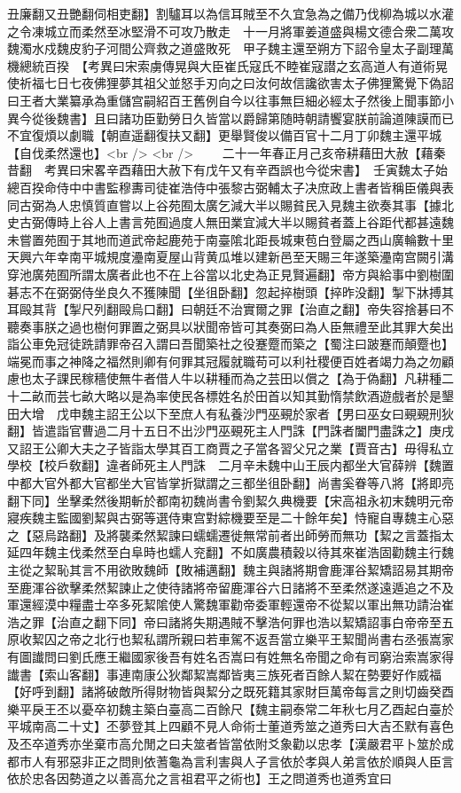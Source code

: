 丑廉翻又丑艷翻伺相吏翻】割驢耳以為信耳賊至不久宜急為之備乃伐柳為城以水灌之令凍城立而柔然至冰堅滑不可攻乃散走　十一月將軍姜道盛與楊文德合衆二萬攻魏濁水戍魏皮豹子河間公齊救之道盛敗死　甲子魏主還至朔方下詔令皇太子副理萬機總統百揆　【考異曰宋索虜傳晃與大臣崔氏寇氏不睦崔寇譛之玄高道人有道術晃使祈福七日七夜佛狸夢其祖父並怒手刃向之曰汝何故信讒欲害太子佛狸驚覺下偽詔曰王者大業纂承為重儲宫嗣紹百王舊例自今以往事無巨細必經太子然後上聞事節小異今從後魏書】且曰諸功臣勤勞日久皆當以爵歸第随時朝請饗宴朕前論道陳謨而已不宜復煩以劇職【朝直遥翻復扶又翻】更舉賢俊以備百官十二月丁卯魏主還平城【自伐柔然還也】<br />
<br />
　　二十一年春正月己亥帝耕藉田大赦【藉秦昔翻　考異曰宋畧辛酉藉田大赦下有戊午又有辛酉誤也今從宋書】　壬寅魏太子始總百揆命侍中中書監穆夀司徒崔浩侍中張黎古弼輔太子决庶政上書者皆稱臣儀與表同古弼為人忠慎質直嘗以上谷苑囿太廣乞減大半以賜貧民入見魏主欲奏其事【據北史古弼傳時上谷人上書言苑囿過度人無田業宜減大半以賜貧者蓋上谷距代都甚遠魏未嘗置苑囿于其地而道武帝起鹿苑于南臺隂北距長城東苞白登屬之西山廣輪數十里天興六年幸南平城規度灅南夏屋山背黄瓜堆以建新邑至天賜三年遂築灅南宫闕引溝穿池廣苑囿所謂太廣者此也不在上谷當以北史為正見賢遍翻】帝方與給事中劉樹圍碁志不在弼弼侍坐良久不獲陳聞【坐徂卧翻】忽起捽樹頭【捽昨没翻】掣下牀搏其耳毆其背【掣尺列翻毆烏口翻】曰朝廷不治實爾之罪【治直之翻】帝失容捨碁曰不聽奏事朕之過也樹何罪置之弼具以狀聞帝皆可其奏弼曰為人臣無禮至此其罪大矣出詣公車免冠徒跣請罪帝召入謂曰吾聞築社之役蹇蹷而築之【蜀注曰跛蹇而顛蹷也】端冕而事之神降之福然則卿有何罪其冠履就職苟可以利社稷便百姓者竭力為之勿顧慮也太子課民稼穡使無牛者借人牛以耕種而為之芸田以償之【為于偽翻】凡耕種二十二畝而芸七畝大略以是為率使民各標姓名於田首以知其勤惰禁飲酒遊戲者於是墾田大增　戊申魏主詔王公以下至庶人有私養沙門巫覡於家者【男曰巫女曰覡覡刑狄翻】皆遣詣官曹過二月十五日不出沙門巫覡死主人門誅【門誅者闔門盡誅之】庚戌又詔王公卿大夫之子皆詣太學其百工商賈之子當各習父兄之業【賈音古】毋得私立學校【校戶敎翻】違者師死主人門誅　二月辛未魏中山王辰内都坐大官薛辨【魏置中都大官外都大官都坐大官皆掌折獄謂之三都坐徂卧翻】尚書奚眷等八將【將即亮翻下同】坐擊柔然後期斬於都南初魏尚書令劉絜久典機要【宋高祖永初末魏明元帝寢疾魏主監國劉絜與古弼等選侍東宫對綜機要至是二十餘年矣】恃寵自專魏主心惡之【惡烏路翻】及將襲柔然絜諫曰蠕蠕遷徙無常前者出師勞而無功【絜之言蓋指太延四年魏主伐柔然至白阜時也蠕人兖翻】不如廣農積穀以待其來崔浩固勸魏主行魏主從之絜恥其言不用欲敗魏師【敗補邁翻】魏主與諸將期會鹿渾谷絜矯詔易其期帝至鹿渾谷欲擊柔然絜諫止之使待諸將帝留鹿渾谷六日諸將不至柔然遂遠遁追之不及軍還經漠中糧盡士卒多死絜隂使人驚魏軍勸帝委軍輕還帝不從絜以軍出無功請治崔浩之罪【治直之翻下同】帝曰諸將失期遇賊不擊浩何罪也浩以絜矯詔事白帝帝至五原收絜囚之帝之北行也絜私謂所親曰若車駕不返吾當立樂平王絜聞尚書右丞張嵩家有圖䜟問曰劉氏應王繼國家後吾有姓名否嵩曰有姓無名帝聞之命有司窮治索嵩家得䜟書【索山客翻】事連南康公狄鄰絜嵩鄰皆夷三族死者百餘人絜在勢要好作威福【好呼到翻】諸將破敵所得財物皆與絜分之既死籍其家財巨萬帝每言之則切齒癸酉樂平戾王丕以憂卒初魏主築白臺高二百餘尺【魏主嗣泰常二年秋七月乙酉起白臺於平城南高二十丈】丕夢登其上四顧不見人命術士董道秀筮之道秀曰大吉丕默有喜色及丕卒道秀亦坐棄市高允閒之曰夫筮者皆當依附爻象勸以忠孝【漢嚴君平卜筮於成都市人有邪惡非正之問則依蓍龜為言利害與人子言依於孝與人弟言依於順與人臣言依於忠各因勢道之以善高允之言祖君平之術也】王之問道秀也道秀宜曰